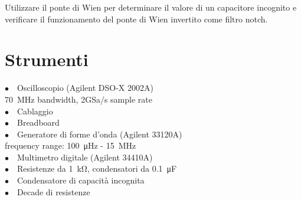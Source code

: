 
Utilizzare il ponte di Wien per determinare il valore di un capacitore incognito e verificare il funzionamento del ponte di Wien invertito come filtro notch.

\section{Strumenti}
$\bullet \quad$Oscilloscopio (Agilent DSO-X 2002A)\\
\phantom{xxxx}\SI{70}{\mega\hertz} bandwidth, 2GSa/s sample rate\\
$\bullet \quad$Cablaggio\\
$\bullet \quad$Breadboard\\
$\bullet \quad$Generatore di forme d'onda (Agilent 33120A)\\
\phantom{xxxx}frequency range: \SI{100}{\micro\hertz} - \SI{15}{\mega\hertz}\\
$\bullet \quad$Multimetro digitale (Agilent 34410A)\\
$\bullet \quad$Resistenze da \SI{1}{\kilo\ohm}, condensatori da \SI{0.1}{\micro\farad}\\
$\bullet \quad$Condensatore di capacità incognita\\
$\bullet \quad$Decade di resistenze 